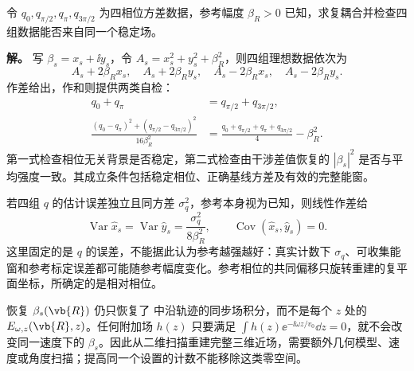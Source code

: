 \begin{exbox}[复近场反演的闭式自检与误差传播]
令 $q_0,q_{\pi/2},q_\pi,q_{3\pi/2}$ 为四相位方差数据，参考幅度 $\beta_R>0$ 已知，求复耦合并检查四组数据能否来自同一个稳定场。

\textbf{解。} 写 $\beta_s=x_s+\ii y_s$，令 $A_s=x_s^2+y_s^2+\beta_R^2$，则四组理想数据依次为
\begin{equation*}
 A_s+2\beta_Rx_s,\quad A_s+2\beta_Ry_s,\quad
 A_s-2\beta_Rx_s,\quad A_s-2\beta_Ry_s.
\end{equation*}
作差给出，作和则提供两类自检：
\begin{align*}
 q_0+q_\pi&=q_{\pi/2}+q_{3\pi/2},\\
 \frac{(q_0-q_\pi)^2+(q_{\pi/2}-q_{3\pi/2})^2}{16\beta_R^2}
 &=\frac{q_0+q_{\pi/2}+q_\pi+q_{3\pi/2}}4-\beta_R^2.
\end{align*}
第一式检查相位无关背景是否稳定，第二式检查由干涉差值恢复的 $|\beta_s|^2$ 是否与平均强度一致。其成立条件包括稳定相位、正确基线方差及有效的完整能窗。

若四组 $q$ 的估计误差独立且同方差 $\sigma_q^2$，参考本身视为已知，则线性作差给
\begin{equation*}
 \operatorname{Var}\widehat x_s=\operatorname{Var}\widehat y_s
 =\frac{\sigma_q^2}{8\beta_R^2},\qquad
 \operatorname{Cov}(\widehat x_s,\widehat y_s)=0.
\end{equation*}
这里固定的是 $q$ 的误差，不能据此认为参考越强越好：真实计数下 $\sigma_q$、可收集能窗和参考标定误差都可能随参考幅度变化。参考相位的共同偏移只旋转重建的复平面坐标，所确定的是相对相位。
\end{exbox}

恢复 $\beta_s(\vb{R})$ 仍只恢复了 中沿轨迹的同步场积分，而不是每个 $z$ 处的 $E_{\omega,z}(\vb{R},z)$。任何附加场 $h(z)$ 只要满足 $\int h(z)\ee^{-\ii\omega z/v_0}\dd z=0$，就不会改变同一速度下的 $\beta_s$。因此从二维扫描重建完整三维近场，需要额外几何模型、速度或角度扫描；提高同一个设置的计数不能移除这类零空间。


